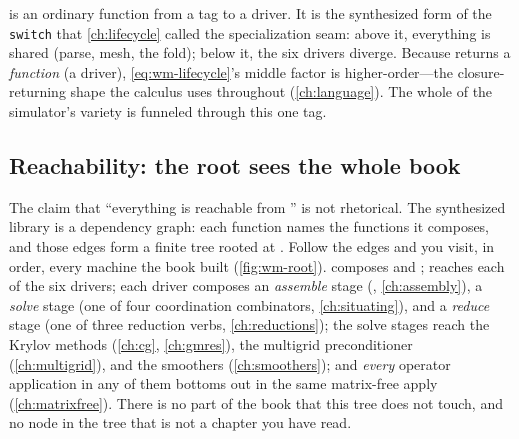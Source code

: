 \begin{notationbox}
 is an ordinary function from a  tag to a driver. It
is the synthesized form of the \texttt{switch} that \cref{ch:lifecycle} called the
specialization seam: above it, everything is shared (parse, mesh, the fold); below
it, the six drivers diverge. Because  returns a \emph{function} (a
driver), \cref{eq:wm-lifecycle}'s middle factor is higher-order---the closure-returning
shape the calculus uses throughout (\cref{ch:language}). The whole of the
simulator's variety is funneled through this one tag.
\end{notationbox}

\subsection{Reachability: the root sees the whole book}
\label{sec:wm-reach}

The claim that ``everything is reachable from '' is not rhetorical.
The synthesized library is a dependency graph: each function names the functions it
composes, and those edges form a finite tree rooted at . Follow the
edges and you visit, in order, every machine the book built (\cref{fig:wm-root}).
 composes  and ; 
reaches each of the six drivers; each driver composes an \emph{assemble} stage
(, \cref{ch:assembly}), a \emph{solve} stage (one of four
coordination combinators, \cref{ch:situating}), and a \emph{reduce} stage (one of
three reduction verbs, \cref{ch:reductions}); the solve stages reach the Krylov
methods (\cref{ch:cg}, \cref{ch:gmres}), the multigrid preconditioner
(\cref{ch:multigrid}), and the smoothers (\cref{ch:smoothers}); and \emph{every}
operator application in any of them bottoms out in the same matrix-free apply
(\cref{ch:matrixfree}). There is no part of the book that this tree does not touch,
and no node in the tree that is not a chapter you have read.

